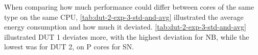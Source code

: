 

When comparing how much performance could differ between cores of the same type on the same CPU, \cref{tab:dut-2-exp-3-std-and-avg} illustrated the average energy consumption and how much it deviated. \cref{tab:dut-2-exp-3-std-and-avg} illustrated DUT 1 deviates more, with the highest deviation for NB, while the lowest was for DUT 2, on P cores for SN.










